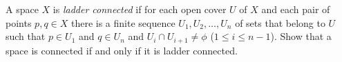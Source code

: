 A space $X$ is \emph{ladder connected} if for each open cover $U$
of $X$ and each pair of points $p,q\in X$ there is a finite sequence
$U_1,U_2,\ldots ,U_n$ of sets that belong to $U$ such that $p\in U_1$
and $q\in U_n$ and $U_i\cap U_{i+1}\neq \phi$ ($1\leq i\leq
n-1$). Show that a space is connected if and only if it is ladder
connected.

